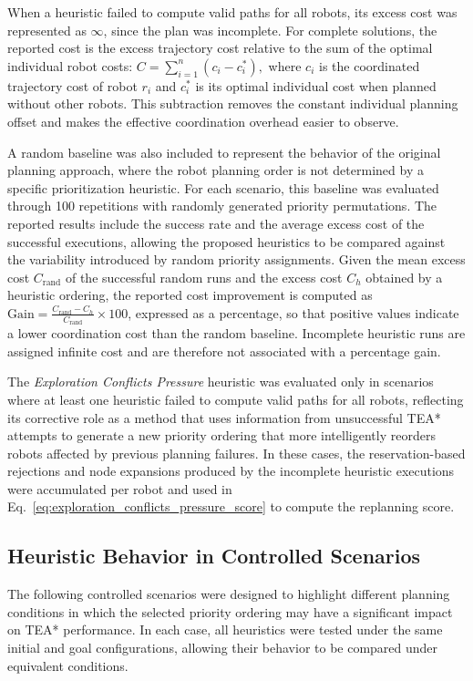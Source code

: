 When a heuristic failed to compute valid paths for all robots, its excess cost was represented as
\(\infty\), since the plan was incomplete. For complete solutions, the reported cost is the excess
trajectory cost relative to the sum of the optimal individual robot costs:
\(C=\sum_{i=1}^{n}(c_i-c_i^{*}),\)
where \(c_i\) is the coordinated trajectory cost of robot \(r_i\) and \(c_i^{*}\) is its optimal
individual cost when planned without other robots. This subtraction removes the constant individual
planning offset and makes the effective coordination overhead easier to observe.

A random baseline was also included to represent the behavior of the original planning approach,
where the robot planning order is not determined by a specific prioritization heuristic. For each
scenario, this baseline was evaluated through 100 repetitions with randomly generated priority
permutations. The reported results include the success rate and the average excess cost of the successful
executions, allowing the proposed heuristics to be compared against the variability introduced by
random priority assignments. Given the mean excess cost \(C_{\mathrm{rand}}\) of the successful random
runs and the excess cost \(C_h\) obtained by a heuristic ordering, the reported cost improvement is
computed as \(\mathrm{Gain}=\frac{C_{\mathrm{rand}}-C_h}{C_{\mathrm{rand}}}\times 100\), expressed as
a percentage, so that positive values indicate a lower coordination cost than the random baseline.
Incomplete heuristic runs are assigned infinite cost and are therefore not associated with a
percentage gain.

The \textit{Exploration Conflicts Pressure} heuristic was evaluated only in scenarios where at
least one heuristic failed to compute valid paths for all robots, reflecting its corrective role as a
method that uses information from unsuccessful TEA* attempts to generate a new priority ordering
that more intelligently reorders robots affected by previous planning failures. In these cases, the
reservation-based rejections and node expansions produced by the incomplete heuristic executions
were accumulated per robot and used in Eq.~\ref{eq:exploration_conflicts_pressure_score} to
compute the replanning score.

\subsection{Heuristic Behavior in Controlled Scenarios}
\label{subsec:heuristic_behavior_controlled_scenarios}
\hspace{\parindent}
The following controlled scenarios were designed to highlight different planning conditions in
which the selected priority ordering may have a significant impact on TEA* performance. In each
case, all heuristics were tested under the same initial and goal configurations, allowing their
behavior to be compared under equivalent conditions.

